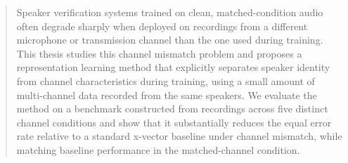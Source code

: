 
\begin{abstract}
Speaker verification systems trained on clean, matched-condition audio
often degrade sharply when deployed on recordings from a different
microphone or transmission channel than the one used during training.
This thesis studies this channel mismatch problem and proposes a
representation learning method that explicitly separates speaker identity
from channel characteristics during training, using a small amount of
multi-channel data recorded from the same speakers. We evaluate the method
on a benchmark constructed from recordings across five distinct channel
conditions and show that it substantially reduces the equal error rate
relative to a standard x-vector baseline under channel mismatch, while
matching baseline performance in the matched-channel condition.
\end{abstract}
